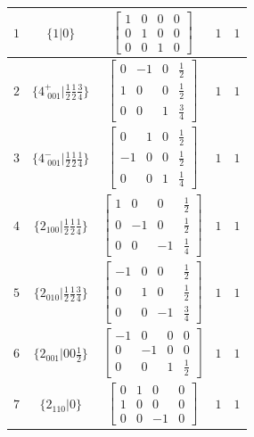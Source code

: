 \documentclass[fleqn,8pt]{jsarticle}
\begin{document}
\begin{longtable}{ccccc}
$ 1 $ & $ \{1|0\} $ & $ \begin{bmatrix} 1 & 0 & 0 & 0 \\ 0 & 1 & 0 & 0 \\ 0 & 0 & 1 & 0 \end{bmatrix} $ & $ 1 $ & $ 1 $ \\ \hline
$ 2 $ & $ \{4^{+}_{\,\,001}|\frac{1}{2} \frac{1}{2} \frac{3}{4}\} $ & $ \begin{bmatrix} 0 & -1 & 0 & \frac{1}{2} \\ 1 & 0 & 0 & \frac{1}{2} \\ 0 & 0 & 1 & \frac{3}{4} \end{bmatrix} $ & $ 1 $ & $ 1 $ \\ \hline
$ 3 $ & $ \{4^{-}_{\,\,001}|\frac{1}{2} \frac{1}{2} \frac{1}{4}\} $ & $ \begin{bmatrix} 0 & 1 & 0 & \frac{1}{2} \\ -1 & 0 & 0 & \frac{1}{2} \\ 0 & 0 & 1 & \frac{1}{4} \end{bmatrix} $ & $ 1 $ & $ 1 $ \\ \hline
$ 4 $ & $ \{2{}_{100}|\frac{1}{2} \frac{1}{2} \frac{1}{4}\} $ & $ \begin{bmatrix} 1 & 0 & 0 & \frac{1}{2} \\ 0 & -1 & 0 & \frac{1}{2} \\ 0 & 0 & -1 & \frac{1}{4} \end{bmatrix} $ & $ 1 $ & $ 1 $ \\ \hline
$ 5 $ & $ \{2{}_{010}|\frac{1}{2} \frac{1}{2} \frac{3}{4}\} $ & $ \begin{bmatrix} -1 & 0 & 0 & \frac{1}{2} \\ 0 & 1 & 0 & \frac{1}{2} \\ 0 & 0 & -1 & \frac{3}{4} \end{bmatrix} $ & $ 1 $ & $ 1 $ \\ \hline
$ 6 $ & $ \{2{}_{001}|0 0 \frac{1}{2}\} $ & $ \begin{bmatrix} -1 & 0 & 0 & 0 \\ 0 & -1 & 0 & 0 \\ 0 & 0 & 1 & \frac{1}{2} \end{bmatrix} $ & $ 1 $ & $ 1 $ \\ \hline
$ 7 $ & $ \{2{}_{110}|0\} $ & $ \begin{bmatrix} 0 & 1 & 0 & 0 \\ 1 & 0 & 0 & 0 \\ 0 & 0 & -1 & 0 \end{bmatrix} $ & $ 1 $ & $ 1 $ \\ \hline

\end{longtable}
\end{document}
